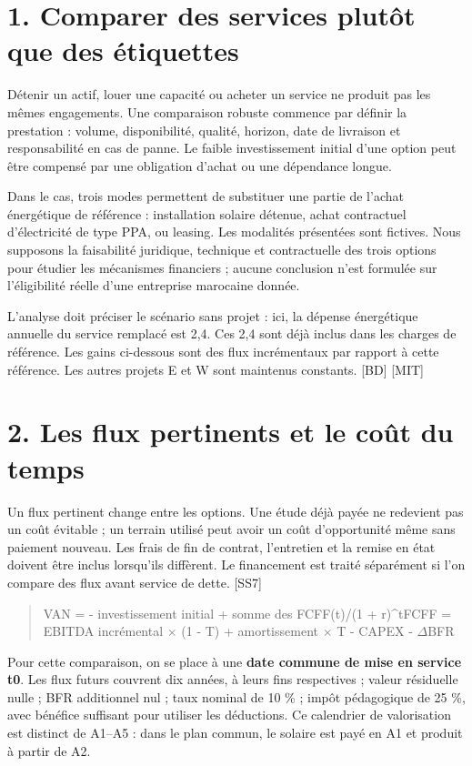 \documentclass[12pt,a4paper]{article}
\begin{document}
\section*{1. Comparer des services plutôt que des étiquettes}
Détenir un actif, louer une capacité ou acheter un service ne produit pas les mêmes engagements. Une comparaison robuste commence par définir la prestation : volume, disponibilité, qualité, horizon, date de livraison et responsabilité en cas de panne. Le faible investissement initial d’une option peut être compensé par une obligation d’achat ou une dépendance longue.


Dans le cas, trois modes permettent de substituer une partie de l’achat énergétique de référence : installation solaire détenue, achat contractuel d’électricité de type PPA, ou leasing. Les modalités présentées sont fictives. Nous supposons la faisabilité juridique, technique et contractuelle des trois options pour étudier les mécanismes financiers ; aucune conclusion n’est formulée sur l’éligibilité réelle d’une entreprise marocaine donnée.


L’analyse doit préciser le scénario sans projet : ici, la dépense énergétique annuelle du service remplacé est 2,4. Ces 2,4 sont déjà inclus dans les charges de référence. Les gains ci-dessous sont des flux incrémentaux par rapport à cette référence. Les autres projets E et W sont maintenus constants. [BD] [MIT]

\section*{2. Les flux pertinents et le coût du temps}
Un flux pertinent change entre les options. Une étude déjà payée ne redevient pas un coût évitable ; un terrain utilisé peut avoir un coût d’opportunité même sans paiement nouveau. Les frais de fin de contrat, l’entretien et la remise en état doivent être inclus lorsqu’ils diffèrent. Le financement est traité séparément si l’on compare des flux avant service de dette. [SS7]



\begin{quote}\small VAN = - investissement initial + somme des FCFF(t)/(1 + r)\textasciicircum{}t\newline FCFF = EBITDA incrémental $\times$ (1 - T) + amortissement $\times$ T - CAPEX - $\Delta$BFR\end{quote}

Pour cette comparaison, on se place à une \textbf{date commune de mise en service t0}. Les flux futurs couvrent dix années, à leurs fins respectives ; valeur résiduelle nulle ; BFR additionnel nul ; taux nominal de 10 \% ; impôt pédagogique de 25 \%, avec bénéfice suffisant pour utiliser les déductions. Ce calendrier de valorisation est distinct de A1--A5 : dans le plan commun, le solaire est payé en A1 et produit à partir de A2.
\end{document}
